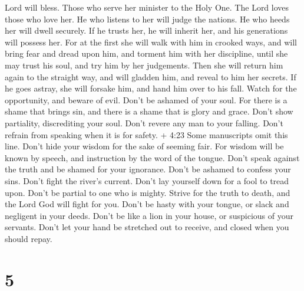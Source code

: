 Lord will bless.  Those who serve her minister to the Holy
One. The Lord loves those who love her.  He who listens to
her will judge the nations. He who heeds her will dwell securely.
 If he trusts her, he will inherit her, and his generations
will possess her.  For at the first she will walk with him
in crooked ways, and will bring fear and dread upon him, and torment him
with her discipline, until she may trust his soul, and try him by her
judgements.  Then she will return him again to the straight
way, and will gladden him, and reveal to him her secrets. 
If he goes astray, she will forsake him, and hand him over to his fall.
 Watch for the opportunity, and beware of evil. Don't be
ashamed of your soul.  For there is a shame that brings
sin, and there is a shame that is glory and grace.  Don't
show partiality, discrediting your soul. Don't revere any man to your
falling.  Don't refrain from speaking when it is for
safety. + 4:23 Some manuscripts omit this line. Don't hide your wisdom
for the sake of seeming fair.  For wisdom will be known by
speech, and instruction by the word of the tongue.  Don't
speak against the truth and be shamed for your ignorance. 
Don't be ashamed to confess your sins. Don't fight the river's current.
 Don't lay yourself down for a fool to tread upon. Don't be
partial to one who is mighty.  Strive for the truth to
death, and the Lord God will fight for you.  Don't be hasty
with your tongue, or slack and negligent in your deeds. 
Don't be like a lion in your house, or suspicious of your servants.
 Don't let your hand be stretched out to receive, and
closed when you should repay.

\hypertarget{section-1}{%
\section{5}\label{section-1}}

